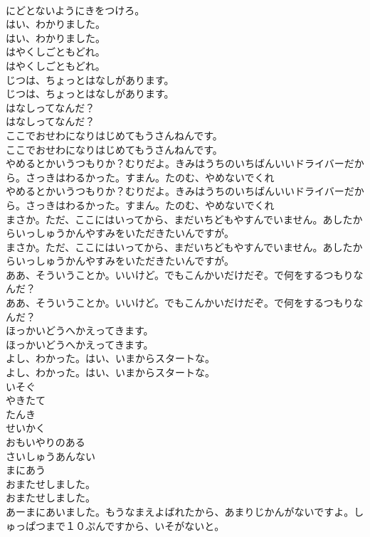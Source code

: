 \documentclass[8pt]{extreport}
\begin{document}
\begin{CJK}{UTF8}{min}
\\	にどとないようにきをつけろ。
\\	はい、わかりました。
\\	はい、わかりました。
\\	はやくしごともどれ。
\\	はやくしごともどれ。
\\	じつは、ちょっとはなしがあります。
\\	じつは、ちょっとはなしがあります。
\\	はなしってなんだ？
\\	はなしってなんだ？
\\	ここでおせわになりはじめてもうさんねんです。
\\	ここでおせわになりはじめてもうさんねんです。
\\	やめるとかいうつもりか？むりだよ。きみはうちのいちばんいいドライバーだから。さっきはわるかった。すまん。たのむ、やめないでくれ
\\	やめるとかいうつもりか？むりだよ。きみはうちのいちばんいいドライバーだから。さっきはわるかった。すまん。たのむ、やめないでくれ
\\	まさか。ただ、ここにはいってから、まだいちどもやすんでいません。あしたからいっしゅうかんやすみをいただきたいんですが。
\\	まさか。ただ、ここにはいってから、まだいちどもやすんでいません。あしたからいっしゅうかんやすみをいただきたいんですが。
\\	ああ、そういうことか。いいけど。でもこんかいだけだぞ。で何をするつもりなんだ？
\\	ああ、そういうことか。いいけど。でもこんかいだけだぞ。で何をするつもりなんだ？
\\	ほっかいどうへかえってきます。
\\	ほっかいどうへかえってきます。
\\	よし、わかった。はい、いまからスタートな。
\\	よし、わかった。はい、いまからスタートな。
\\	いそぐ
\\	やきたて
\\	たんき
\\	せいかく
\\	おもいやりのある
\\	さいしゅうあんない
\\	まにあう
\\	おまたせしました。
\\	おまたせしました。
\\	あーまにあいました。もうなまえよばれたから、あまりじかんがないですよ。しゅっぱつまで１０ぷんですから、いそがないと。

\end{CJK}
\end{document}

